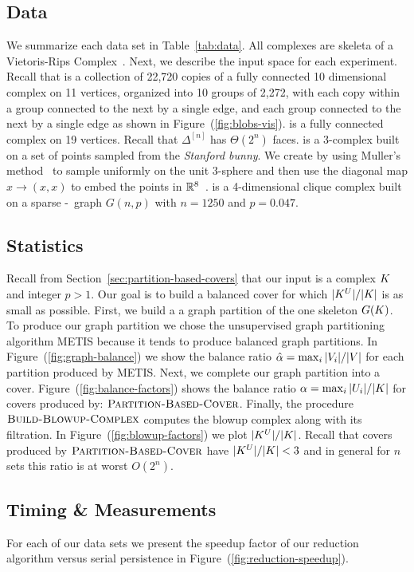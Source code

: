 \subsection{Data}
 
We summarize each data set in Table~\ref{tab:data}.  All complexes are skeleta of a Vietoris-Rips Complex~\cite{z-fcv-10}.  
Next, we describe the input space for each experiment. 
Recall that {\blobs} is a collection of 22,720 copies of a fully connected 10 dimensional complex on 11 vertices, organized
into 10 groups of 2,272, with each 
copy within a group connected to the next by a single edge, and each group connected to the next by a single edge as shown in Figure~(\ref{fig:blobs-vis}). 
{\clique} is a fully connected complex on 19 vertices. Recall that $\Delta^{[n]}$ has $\Theta(2^n)$ 
faces. {\bunny} is a 3-complex built on a set of points sampled from the 
\emph{Stanford bunny}. We create {\sphere} by using Muller's method~\cite{m-nmgpuns-59} to sample 
uniformly on the unit 3-sphere and then use the diagonal map
$x \rightarrow (x,x)$ to embed the points in $\mathbb{R}^8$~\cite{hatcher}. {\gnp} is a 
4-dimensional clique complex built on a sparse \Erdos-\Renyi\ graph $G(n,p)$ 
with $n = 1250$ and $p = 0.047$.

\subsection{Statistics}

Recall from Section~\ref{sec:partition-based-covers} that our input is a complex
$K$ and integer $p > 1$. Our goal is to build a balanced cover for 
which $|K^{U}|/|K|$ is as small as possible. First, we build a a graph partition of
the one skeleton $G(K)$. To produce our graph partition we chose the
unsupervised graph partitioning algorithm METIS because it tends to produce 
balanced graph partitions. In Figure~(\ref{fig:graph-balance}) we show the balance
ratio $\hat{\alpha} = \max_i{|V_i|}/|V|$ for each partition produced by METIS.
Next, we complete our graph partition into a cover. Figure~(\ref{fig:balance-factors})
shows the balance ratio $\alpha = \max_i{|U_i|}/|K|$ for covers
produced by: $\textnormal{\scshape Partition-Based-Cover}$.
Finally, the procedure $\textnormal{\scshape Build-Blowup-Complex}$ 
computes the blowup complex along with its filtration. 
In Figure~(\ref{fig:blowup-factors}) we plot $|K^{U}|/|K|$. Recall that 
covers produced by $\textnormal{\scshape Partition-Based-Cover}$ have
$|K^{U}|/|K| < 3$ and in general for $n$ sets this ratio is at worst $O(2^n)$. 

\subsection{Timing \& Measurements}
For each of our data sets we present the speedup factor of
our reduction algorithm versus serial persistence in Figure~(\ref{fig:reduction-speedup}).

